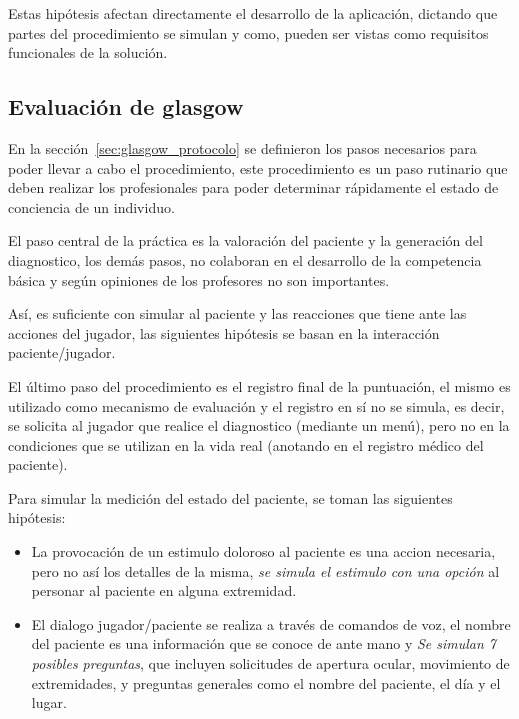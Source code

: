 Estas hipótesis afectan directamente el desarrollo de la aplicación, dictando
que partes del procedimiento se simulan y como, pueden ser vistas como
requisitos funcionales de la solución.

\subsection{Evaluación de glasgow}
\label{sec:glasgow_hipotesis}

En la sección~\ref{sec:glasgow_protocolo} se definieron los pasos necesarios
para poder llevar a cabo el procedimiento, este procedimiento es un paso
rutinario que deben realizar los profesionales para poder determinar rápidamente
el estado de conciencia de un individuo. 

El paso central de la práctica es la valoración del paciente y la generación del
diagnostico, los demás pasos, no colaboran en el desarrollo de la competencia
básica y según opiniones de los profesores no son importantes.

Así, es suficiente con simular al paciente y las reacciones que tiene ante las
acciones del jugador, las siguientes hipótesis se basan en la interacción
paciente/jugador.

El último paso del procedimiento es el registro final de la puntuación, el mismo
es utilizado como mecanismo de evaluación y el registro en sí no se simula, es
decir, se solicita al jugador que realice el diagnostico (mediante un menú),
pero no en la condiciones que se utilizan en la vida real (anotando en el
registro médico del paciente).

Para simular la medición del estado del paciente, se toman las siguientes
hipótesis:

\begin{itemize}
    \item La provocación de un estimulo doloroso al paciente es una accion
        necesaria, pero no así los detalles de la misma, \emph{se simula el
            estimulo con una opción} al personar al paciente en alguna
        extremidad.
    \item El dialogo jugador/paciente se realiza a través de comandos de voz, el
        nombre del paciente es una información que se conoce de ante mano y
        \emph{Se simulan 7 posibles preguntas}, que incluyen solicitudes de
        apertura ocular, movimiento de extremidades, y preguntas generales como
        el nombre del paciente, el día y el lugar.
\end{itemize}


